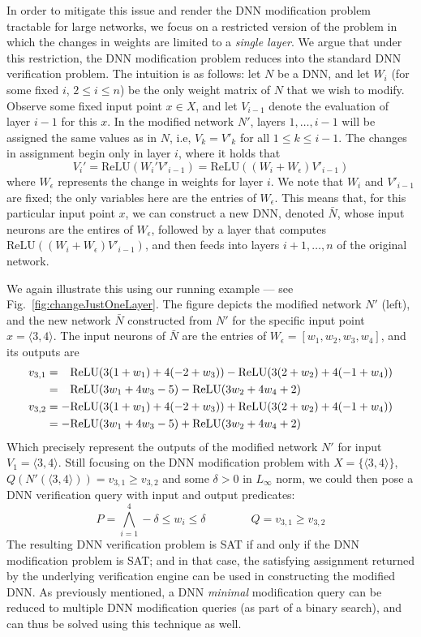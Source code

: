 \documentclass{easychair}
\newcommand{\relu}{\text{ReLU}\xspace{}}
\newcommand{\ben}[1]{\marginpar{\textcolor{blue}{Ben: #1}}}
\begin{document}
In order to mitigate this issue and render the DNN modification
problem tractable 
for large networks, we focus on a restricted version of
the problem in which the changes in weights are
limited to a \emph{single layer}. We argue that under this
restriction, the DNN modification problem reduces into the standard DNN
verification problem. The intuition is as follows: let $N$ be a DNN,
and let $W_i$ (for some fixed $i$, $2\leq i\leq n$) be the only weight matrix of $N$ that
we wish to modify. Observe some fixed input point $x\in X$, and let
$V_{i-1}$ denote the evaluation of layer $i-1$ for this $x$. In the
modified network $N'$, layers $1,\ldots,i-1$ will be assigned the same
values as in $N$, i.e, $V_k=V'_k$ for all $1\leq k\leq i-1$. The
changes in assignment begin only in layer $i$, where it holds that
\[
  V_i' = \relu{}(W_i'V'_{i-1}) = \relu{}((W_i+W_\epsilon)V'_{i-1})
\]
where $W_\epsilon$ represents the change in weights for layer $i$. We note that
$W_i$ and $V'_{i-1}$ are fixed; the only variables here are the
entries of $W_\epsilon$. This means that, for this particular input
point $x$,  we can construct a new DNN,
denoted $\bar{N}$, whose input neurons are the entires of $W_\epsilon$,
followed by a layer that computes $\relu{}((W_i+W_\epsilon)V'_{i-1})$,
and then feeds into layers $i+1,\ldots,n$ of the original network.

We again illustrate this using our running example --- see
Fig.~\ref{fig:changeJustOneLayer}. The figure depicts the modified
network $N'$ (left), and the new network $\bar{N}$ constructed from
$N'$ for the specific input point $x=\langle 3,4\rangle$.
The input neurons of
$\bar{N}$ are the entries of
$W_\epsilon=[w_1,w_2,w_3,w_4]$, and its outputs are
\begin{align*}
  v_{3,1}&= {\color{white}+}\relu{}(3(1+w_1)+4(-2+w_3))
    -
    \relu{}(3(2+w_2)+4(-1+w_4))
  \\
        &= {\color{white}+}\relu{}(3w_1+4w_3-5)
    -
       \relu{}(3w_2 + 4w_4 +2)
       \\
  v_{3,2}&= -\relu{}(3(1+w_1)+4(-2+w_3))
    +
           \relu{}(3(2+w_2)+4(-1+w_4))
  \\
        &= -\relu{}(3w_1+4w_3-5)
    +
    \relu{}(3w_2+4w_4+2)
\end{align*}
Which precisely represent the outputs of the modified network $N'$ for input
$V_1=\langle 3,4 \rangle$. Still focusing on the DNN modification
problem with $X=\{\langle 3, 4\rangle\}$, $Q(N'(\langle
3,4\rangle))=v_{3,1}\geq v_{3,2}$ and some $\delta> 0$ in $L_\infty$
norm, we could then pose a DNN verification query with input and
output predicates:
\ben{Maybe saying a word about the $L_1$ norm being solvable as well?}
\[
  P = \bigwedge_{i=1}^4-\delta \leq w_i \leq \delta \qquad \qquad Q = v_{3,1}\geq v_{3,2}
\]
The resulting DNN verification problem is SAT if and only if the DNN
modification problem is SAT; and in that case, the satisfying
assignment returned by the underlying verification engine can be used
in constructing the modified DNN. As previously mentioned, a DNN
\emph{minimal} modification query can be reduced to multiple DNN
modification queries (as part of a binary search), and can thus be
solved using this technique as well.
\end{document}
